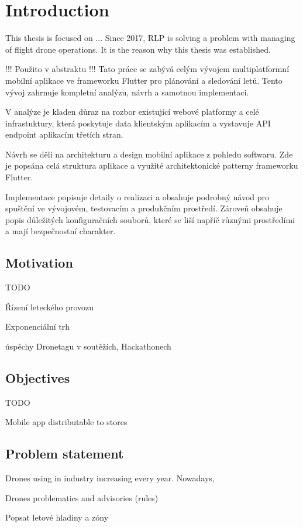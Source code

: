 \chapter{Introduction}\label{ch:introduction}
This thesis is focused on ...
Since 2017, RLP is solving a problem with managing of flight drone operations.
It is the reason why this thesis was established.

!!! Použito v abstraktu !!!
Tato práce se zabývá celým vývojem multiplatformní mobilní aplikace ve frameworku Flutter pro plánování a sledování letů.
Tento vývoj zahrnuje kompletní analýzu, návrh a samotnou implementaci.

V analýze je kladen důraz na rozbor existující webové platformy a celé infrastuktury, která poskytuje data klientským aplikacím a vystavuje API endpoint aplikacím třetích stran.

Návrh se dělí na architekturu a design mobilní aplikace z pohledu softwaru.
Zde je popsána celá struktura aplikace a využité architektonické patterny frameworku Flutter.

Implementace popisuje detaily o realizaci a obsahuje podrobný návod pro spuštění ve vývojovém, testovacím a produkčním prostředí.
Zároveň obsahuje popis důležitých konfiguračních souborů, které se liší napříč různými prostředími a mají bezpečnostní charakter.

\section{Motivation}\label{sec:motivation}
TODO

Řízení leteckého provozu

Exponenciální trh

úspěchy Dronetagu v soutěžích, Hackathonech


\section{Objectives}\label{sec:objectives}
TODO

Mobile app distributable to stores

\section{Problem statement}\label{sec:problem-statement}
Drones using in industry increasing every year.
Nowadays,

Drones problematics and advisories (rules)

Popsat letové hladiny a zóny
